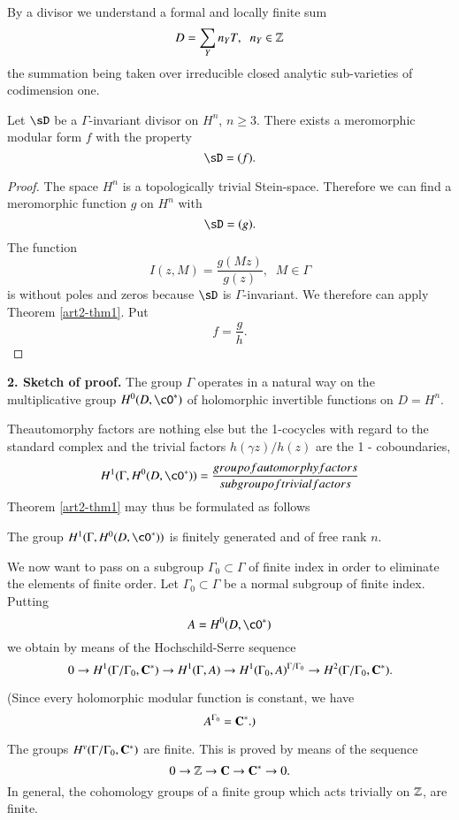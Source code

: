 By a divisor we understand a formal and locally finite sum
$$
D = \sum\limits_Y n_Y T, \;\; n_Y \in \mathbb{Z} 
$$
the summation being taken over irreducible closed analytic sub-varieties of codimension one.

\begin{thm}\label{art2-thm2}%
Let $\sD$ be a $\Gamma$-invariant divisor on $H^n$, $n \geqslant 3$. There exists a meromorphic modular form $f$ with the property
$$
\sD = (f).
$$
\end{thm}

\begin{proof}
The space $H^n$ is a topologically trivial Stein-space. Therefore we can find a meromorphic function $g$ on $H^n$ with
$$
\sD  = (g).
$$
The function
$$
I (z, M) = \frac{g(Mz)}{g(z)}, \;\; M \in \Gamma
$$
is without poles and zeros because $\sD$ is $\Gamma$-invariant. We therefore can apply Theorem \ref{art2-thm1}. Put
$$
f = \frac{g}{h}.
$$
\end{proof}

\medskip
\noindent
\textbf{2. Sketch of proof.} The group $\Gamma$ operates in a natural way on the multiplicative group $H^0 (D, \cO^\ast)$ of holomorphic invertible functions on $D = H^n$.

The\pageoriginale automorphy factors are nothing else but the 1-cocycles with regard to the standard complex and the trivial factors $h(\gamma z)/ h(z)$ are the 1 - coboundaries, \iec
$$
H^1 (\Gamma, H^0 (D, \cO^\ast)) = \frac{group of automorphy factors}{subgroup of trivial factors}
$$
Theorem \ref{art2-thm1} may thus be formulated as follows

\begin{thm}\label{art2-thm3}
The group $H^1 (\Gamma, H^0 (D, \cO^\ast))$ is finitely generated and of free rank $n$.
\end{thm}

We now want to pass on a subgroup $\Gamma_0 \subset \Gamma$ of finite index in order to eliminate the elements of finite order. Let $\Gamma_0 \subset \Gamma$ be a normal subgroup of finite index. Putting
$$
A = H^0 (D, \cO^\ast)
$$
we obtain by means of the Hochschild-Serre sequence
$$
0 \to H^1 (\Gamma /\Gamma_0, \mathbf{C}^\ast) \to H^1 (\Gamma, A) \to H^1 (\Gamma_0, A)^{\Gamma/\Gamma_0} \to H^2 (\Gamma/\Gamma_0, \mathbf{C}^{\ast}).
$$

(Since every holomorphic modular function is constant, we have
$$
A^{\Gamma_0} = \mathbf{C}^\ast.)
$$

The groups $H^v (\Gamma /\Gamma_0, \mathbf{C}^\ast)$ are finite. This is proved by means of the sequence
$$
0 \to \mathbb{Z} \to \mathbf{C} \to \mathbf{C}^\ast \to 0.
$$
In general, the cohomology groups of a finite group which acts trivially on $\mathbb{Z}$, are finite.

